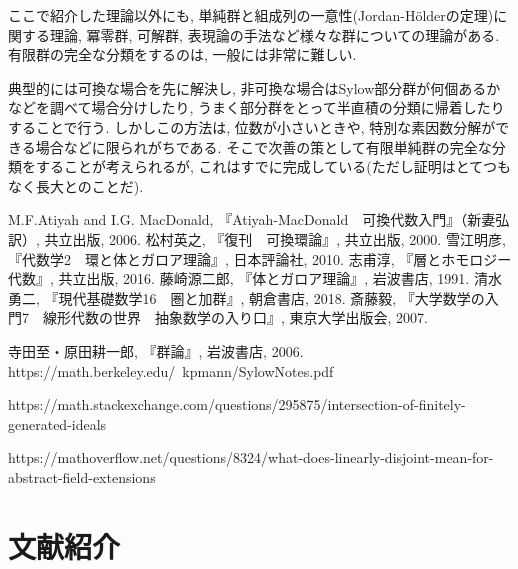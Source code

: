 \documentclass[a4paper, twoside]{bxjsarticle}
\theoremstyle{definition}
\begin{document}
    ここで紹介した理論以外にも, 単純群と組成列の一意性(Jordan-Hölderの定理)に関する理論, 冪零群, 可解群, 表現論の手法など様々な群についての理論がある.
    有限群の完全な分類をするのは, 一般には非常に難しい.

    典型的には可換な場合を先に解決し, 非可換な場合はSylow部分群が何個あるかなどを調べて場合分けしたり, うまく部分群をとって半直積の分類に帰着したりすることで行う.
    しかしこの方法は, 位数が小さいときや, 特別な素因数分解ができる場合などに限られがちである.
    そこで次善の策として有限単純群の完全な分類をすることが考えられるが, これはすでに完成している(ただし証明はとてつもなく長大とのことだ).


    \cleardoublepage
    \begin{thebibliography}{99}
         M.F.Atiyah and I.G. MacDonald, 『Atiyah-MacDonald　可換代数入門』（新妻弘訳）, 共立出版, 2006.
         松村英之, 『復刊　可換環論』, 共立出版, 2000.
         雪江明彦, 『代数学2　環と体とガロア理論』, 日本評論社, 2010.
         志甫淳, 『層とホモロジー代数』, 共立出版, 2016.
         藤崎源二郎, 『体とガロア理論』, 岩波書店, 1991.
         清水勇二, 『現代基礎数学16　圏と加群』, 朝倉書店, 2018.
         斎藤毅, 『大学数学の入門7　線形代数の世界　抽象数学の入り口』, 東京大学出版会, 2007. 

         寺田至・原田耕一郎, 『群論』, 岩波書店, 2006.
        https://math.berkeley.edu/~kpmann/SylowNotes.pdf

        https://math.stackexchange.com/questions/295875/intersection-of-finitely-generated-ideals

        https://mathoverflow.net/questions/8324/what-does-linearly-disjoint-mean-for-abstract-field-extensions

    \end{thebibliography}

    \section*{文献紹介}
\end{document}
